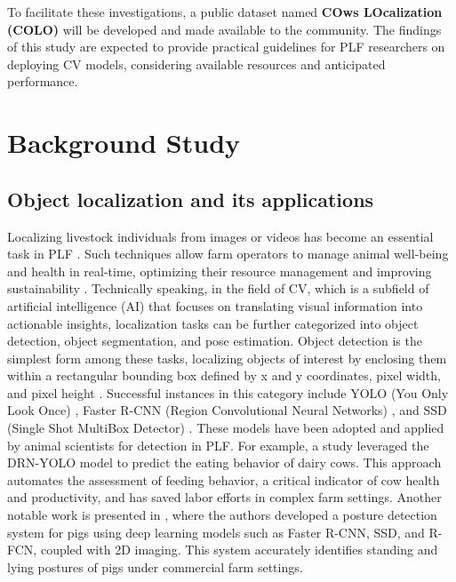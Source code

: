 To facilitate these investigations, a public dataset named \textbf{COws LOcalization (COLO)} will be developed and made available to the community. The findings of this study are expected to provide practical guidelines for PLF researchers on deploying CV models, considering available resources and anticipated performance.

\section{Background Study}

\subsection*{Object localization and its applications}

Localizing livestock individuals from images or videos has become an essential task in PLF \cite{fernandes2020image}. Such techniques allow farm operators to manage animal well-being and health in real-time, optimizing their resource management and improving sustainability \cite{morrone2022industry, hao2023cattle}. Technically speaking, in the field of CV, which is a subfield of artificial intelligence (AI) that focuses on translating visual information into actionable insights, localization tasks can be further categorized into object detection, object segmentation, and pose estimation. Object detection is the simplest form among these tasks, localizing objects of interest by enclosing them within a rectangular bounding box defined by x and y coordinates, pixel width, and pixel height \cite{viola2001rapid}. Successful instances in this category include YOLO (You Only Look Once) \cite{redmon2016you}, Faster R-CNN (Region Convolutional Neural Networks) \cite{girshick2015fast}, and SSD (Single Shot MultiBox Detector) \cite{liu2016ssd}. These models have been adopted and applied by animal scientists for detection in PLF. For example, a study \cite{yu2022automatic} leveraged the DRN-YOLO model \cite{xu2020improved} to predict the eating behavior of dairy cows. This approach automates the assessment of feeding behavior, a critical indicator of cow health and productivity, and has saved labor efforts in complex farm settings. Another notable work is presented in \cite{nasirahmadi2019deep}, where the authors developed a posture detection system for pigs using deep learning models such as Faster R-CNN, SSD, and R-FCN, coupled with 2D imaging. This system accurately identifies standing and lying postures of pigs under commercial farm settings.

